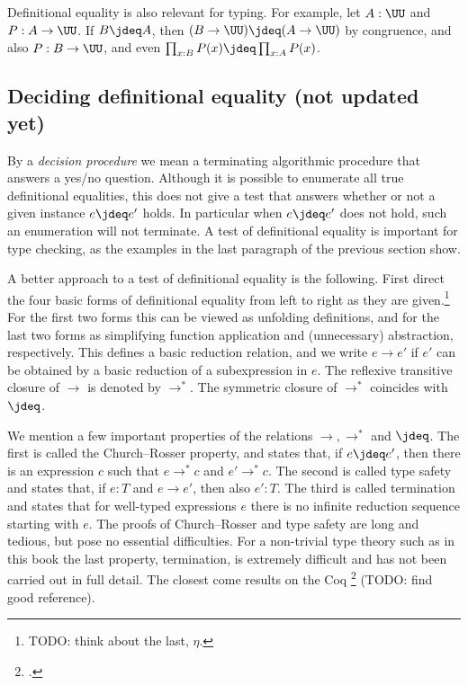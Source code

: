 Definitional equality is also relevant for typing.
For example, let $A: \UU$ and $P: A\to\UU$. If $B\jdeq A$,
then  $ (B\to\UU)\jdeq(A\to\UU)$ by congruence, and also $P: B\to\UU$,
and even $\prod_{x:B} P(x) \jdeq \prod_{x:A} P(x)$.



\subsection{Deciding definitional equality (not updated yet)}
\label{sec:defeq-computation}

By a \emph{decision procedure} we mean a terminating algorithmic procedure that 
answers a yes/no question.
Although it is possible to enumerate all true definitional equalities,
this does not give a test that answers whether or not a given instance $e\jdeq e'$ holds.
In particular when $e\jdeq e'$ does not hold, such an enumeration will not terminate.
A test of definitional equality is important for type checking,
as the examples in the last paragraph of the previous section show.

A better approach to a test of definitional equality is the following.
First direct the four basic forms of definitional equality from left to right
as they are given.\footnote{%
TODO: think about the last, $\eta$.}
For the first two forms this can be viewed as unfolding definitions,
and for the last two forms as simplifying function application and (unnecessary) 
abstraction, respectively.
This defines a basic reduction relation, and we write $e\to e'$ if $e'$ can
be obtained by a basic reduction of a subexpression in $e$. 
The reflexive transitive closure of $\to$ is denoted by $\to^*$.
The symmetric closure of $\to^*$ coincides with $\jdeq$.

We mention a few important properties of the relations $\to,\to^*$ and $\jdeq$.
The first is called the Church--Rosser property, and states that,
if $e\jdeq e'$, then there is an expression $c$ such that $e\to^* c$
and $e'\to^* c$. The second is called type safety and states that,
if $e:T$ and $e\to e'$, then also $e':T$.
The third is called termination and states that for well-typed expressions $e$
there is no infinite reduction sequence starting with $e$.
The proofs of Church--Rosser and type safety are long and tedious, but pose no essential
difficulties. For a non-trivial type theory such as in this book the last property,
termination, is extremely difficult and has not been carried out in full detail.
The closest come results on the Coq \footcite{Coq} (TODO: find good reference).

